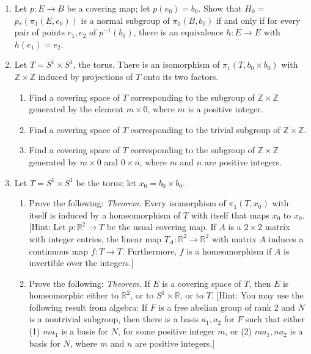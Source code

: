 \begin{enumerate}[itemsep=0.4em, parsep=0pt, topsep=0pt, partopsep=0pt, leftmargin=*, label=\arabic*., ref=\arabic*]
\begin{enumerate}[itemsep=0.2em, parsep=0pt, topsep=0pt, partopsep=0pt, leftmargin=*, label=(\alph*), align=left]
 \item Find a continuous map of the torus into \(S^{1}\) that is not nulhomotopic.
 \end{enumerate}
\item Let \(p : E \rightarrow B\) be a covering map; let \(p( e_{0}) = b_{0}\). Show that \(H_{0} =\) \(p_{ * }( {{\pi }_{1}( {E,e_{0}}) })\) is a normal subgroup of \({\pi }_{1}( {B,b_{0}})\) if and only if for every pair of points \(e_{1},e_{2}\) of \(p^{-1}( b_{0})\), there is an equivalence \(h : E \rightarrow E\) with \(h( e_{1}) = e_{2}\).
\item Let \(T = S^{1} \times {S}^{1}\), the torus. There is an isomorphism of \({\pi }_{1}( {T,b_{0} \times {b}_{0}})\) with \(\mathbb{Z} \times \mathbb{Z}\) induced by projections of \(T\) onto its two factors.
 \begin{enumerate}[itemsep=0.2em, parsep=0pt, topsep=0pt, partopsep=0pt, leftmargin=*, label=(\alph*), align=left]
 \item Find a covering space of \(T\) corresponding to the subgroup of \(\mathbb{Z} \times \mathbb{Z}\) generated by the element \(m \times 0\), where \(m\) is a positive integer.
 \item Find a covering space of \(T\) corresponding to the trivial subgroup of \(\mathbb{Z} \times \mathbb{Z}\).
 \item Find a covering space of \(T\) corresponding to the subgroup of \(\mathbb{Z} \times \mathbb{Z}\) generated by \(m \times 0\) and \(0 \times n\), where \(m\) and \(n\) are positive integers.
 \end{enumerate}
\item[*5.] Let \(T = S^{1} \times {S}^{1}\) be the torus; let \(x_{0} = b_{0} \times {b}_{0}\).
 \begin{enumerate}[itemsep=0.2em, parsep=0pt, topsep=0pt, partopsep=0pt, leftmargin=*, label=(\alph*), align=left]
 \item Prove the following: \textsl{Theorem.} Every isomorphism of \({\pi }_{1}( {T,x_{0}})\) with itself is induced by a homeomorphism of \(T\) with itself that maps \(x_{0}\) to \(x_{0}\). [Hint: Let \(p : \mathbb{R}^{2} \rightarrow T\) be the usual covering map. If \(A\) is a \(2 \times 2\) matrix with integer entries, the linear map \(T_{A} : \mathbb{R}^{2} \rightarrow {\mathbb{R}}^{2}\) with matrix \(A\) induces a continuous map \(f : T \rightarrow T\). Furthermore, \(f\) is a homeomorphism if \(A\) is invertible over the integers.]
 \item Prove the following: \textsl{Theorem.} If \(E\) is a covering space of \(T\), then \(E\) is homeomorphic either to \(\mathbb{R}^{2}\), or to \(S^{1} \times \mathbb{R}\), or to \(T\). [Hint: You may use the following result from algebra: If \(F\) is a free abelian group of rank 2 and \(N\) is a nontrivial subgroup, then there is a basis \(a_{1},a_{2}\) for \(F\) such that either (1) \(ma_{1}\) is a basis for \(N\), for some positive integer \(m\), or (2) \(ma_{1},na_{2}\) is a basis for \(N\), where \(m\) and \(n\) are positive integers.]

\end{enumerate}
\end{enumerate}

